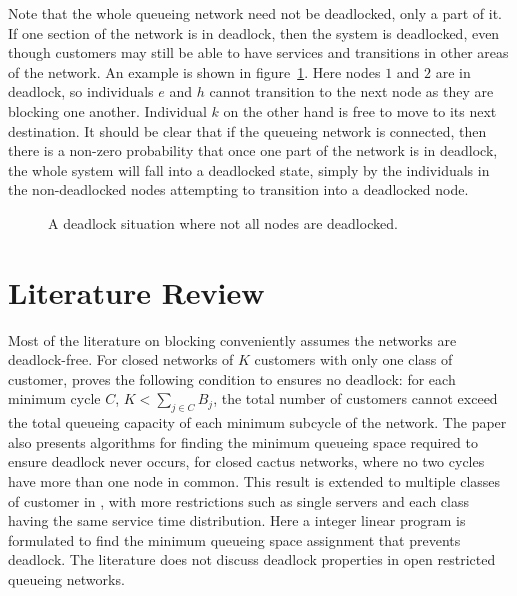 \documentclass{article}
\begin{document}
Note that the whole queueing network need not be deadlocked, only a part of it.
If one section of the network is in deadlock, then the system is deadlocked, even though customers may still be able to have services and transitions in other areas of the network.
An example is shown in figure~\ref{fig:somenodes_notdeadlocked}.
Here nodes $1$ and $2$ are in deadlock, so individuals $e$ and $h$ cannot transition to the next node as they are blocking one another.
Individual $k$ on the other hand is free to move to its next destination.
It should be clear that if the queueing network is connected, then there is a non-zero probability that once one part of the network is in deadlock, the whole system will fall into a deadlocked state, simply by the individuals in the non-deadlocked nodes attempting to transition into a deadlocked node.\newline

\begin{figure}[H]
  
  \caption{A deadlock situation where not all nodes are deadlocked.}
  \label{fig:somenodes_notdeadlocked}
\end{figure}


\section{Literature Review}

Most of the literature on blocking conveniently assumes the networks are deadlock-free.
For closed networks of $K$ customers with only one class of customer, \cite{kunduakyildiz89} proves the following condition to ensures no deadlock: for each minimum cycle $C$, $K < \sum_{j\in C} B_j$, the total number of customers cannot exceed the total queueing capacity of each minimum subcycle of the network.
The paper also presents algorithms for finding the minimum queueing space required to ensure deadlock never occurs, for closed cactus networks, where no two cycles have more than one node in common.
This result is extended to multiple classes of customer in \cite{liebeherrakyildiz95}, with more restrictions such as single servers and each class having the same service time distribution.
Here a integer linear program is formulated to find the minimum queueing space assignment that prevents deadlock.
The literature does not discuss deadlock properties in open restricted queueing networks.\newline
\end{document}
